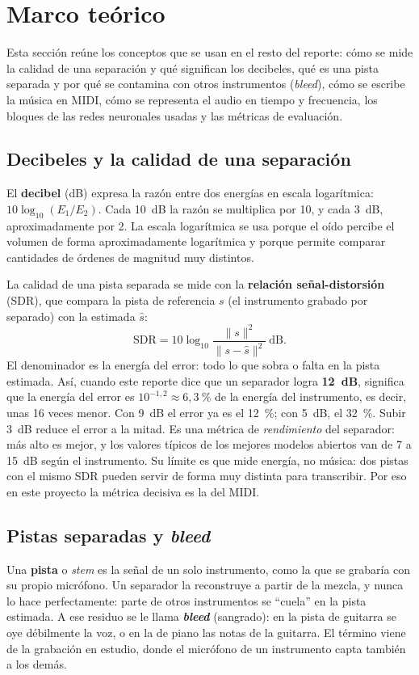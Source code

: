 \documentclass[11pt,a4paper]{article}
\begin{document}
\section{Marco teórico}

Esta sección reúne los conceptos que se usan en el resto del reporte: cómo se mide la calidad de una
separación y qué significan los decibeles, qué es una pista separada y por qué se contamina con otros
instrumentos (\emph{bleed}), cómo se escribe la música en MIDI, cómo se representa el audio en tiempo y
frecuencia, los bloques de las redes neuronales usadas y las métricas de evaluación.

\subsection{Decibeles y la calidad de una separación}
\label{sec:sdr}
El \textbf{decibel} (dB) expresa la razón entre dos energías en escala logarítmica:
$10\log_{10}(E_1/E_2)$. Cada 10~dB la razón se multiplica por 10, y cada 3~dB, aproximadamente por 2.
La escala logarítmica se usa porque el oído percibe el volumen de forma aproximadamente logarítmica y
porque permite comparar cantidades de órdenes de magnitud muy distintos.

La calidad de una pista separada se mide con la \textbf{relación señal-distorsión} (SDR), que compara la
pista de referencia $s$ (el instrumento grabado por separado) con la estimada $\hat s$:
\begin{equation}
\mathrm{SDR} = 10\log_{10}\frac{\lVert s\rVert^2}{\lVert s-\hat s\rVert^2}\ \text{dB}.
\end{equation}
El denominador es la energía del error: todo lo que sobra o falta en la pista estimada. Así, cuando
este reporte dice que un separador logra \textbf{12~dB}, significa que la energía del error es
$10^{-1{,}2}\approx 6{,}3~\%$ de la energía del instrumento, es decir, unas 16 veces menor. Con 9~dB
el error ya es el 12~\%; con 5~dB, el 32~\%. Subir 3~dB reduce el error a la mitad. Es una métrica de
\emph{rendimiento} del separador: más alto es mejor, y los valores típicos de los mejores modelos
abiertos van de 7 a 15~dB según el instrumento. Su límite es que mide energía, no música: dos pistas
con el mismo SDR pueden servir de forma muy distinta para transcribir. Por eso en este proyecto la
métrica decisiva es la del MIDI.

\subsection{Pistas separadas y \emph{bleed}}
Una \textbf{pista} o \emph{stem} es la señal de un solo instrumento, como la que se grabaría con su
propio micrófono. Un separador la reconstruye a partir de la mezcla, y nunca lo hace perfectamente:
parte de otros instrumentos se ``cuela'' en la pista estimada. A ese residuo se le llama
\textbf{\emph{bleed}} (sangrado): en la pista de guitarra se oye débilmente la voz, o en la de piano
las notas de la guitarra. El término viene de la grabación en estudio, donde el micrófono de un
instrumento capta también a los demás.
\end{document}
